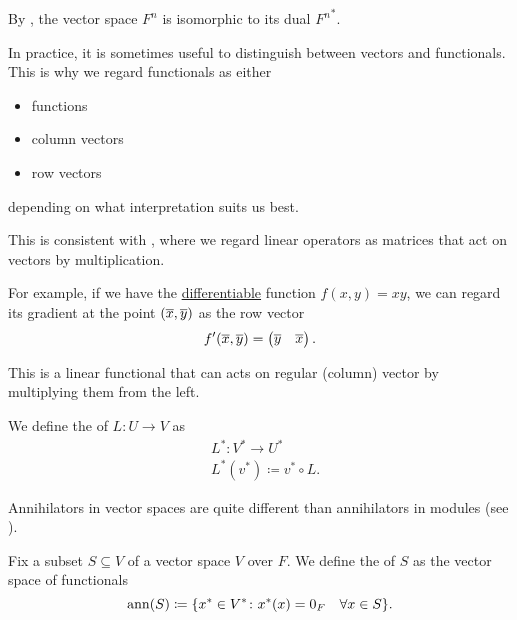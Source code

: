 \begin{remark}\label{remark:finite_dimensional_dual_space_isomorphism}
  By , the vector space \( F^n \) is isomorphic to its dual \( {F^n}^* \).

  In practice, it is sometimes useful to distinguish between vectors and functionals. This is why we regard functionals as either
  \begin{itemize}
    \item functions
    \item column vectors
    \item row vectors
  \end{itemize}
  depending on what interpretation suits us best.

  This is consistent with , where we regard linear operators as matrices that act on vectors by multiplication.

  For example, if we have the \hyperref[def:differentiability]{differentiable} function \( f(x, y) = xy \), we can regard its gradient at the point \( (\overline{x}, \overline{y}) \) as the row vector
  \begin{align*}
    f'(\overline{x}, \overline{y}) =
    \begin{pmatrix}
      \overline{y} & \overline{x}
    \end{pmatrix}.
  \end{align*}

  This is a linear functional that can acts on regular (column) vector by multiplying them from the left.
\end{remark}

\begin{definition}\label{def:dual_linear_operator}
  We define the  of \( L: U \to V \) as
  \begin{align*}
     & L^*: V^* \to U^*                \\
     & L^*(v^*) \coloneqq v^* \circ L.
  \end{align*}
\end{definition}

\begin{definition}\label{def:vector_space_annihilator}
  Annihilators in vector spaces are quite different than annihilators in modules (see ).

  Fix a subset \( S \subseteq V \) of a vector space \( V \) over \( F \). We define the  of \( S \) as the vector space of functionals
  \begin{equation*}
    \operatorname{ann}(S) \coloneqq \{ x^* \in V^* \colon x^*(x) = 0_F \quad\forall x \in S \}.
  \end{equation*}
\end{definition}
